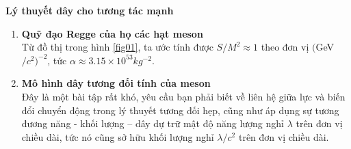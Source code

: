 \textbf{Lý thuyết dây cho tương tác mạnh}

\begin{enumerate}
    \item \textbf{Quỹ đạo Regge của họ các hạt meson}\\
    Từ đồ thị trong hình \ref{fig01}, ta ước tính được $S/M^2 \approx 1$ theo đơn vị $($GeV$/c^2)^{-2}$, tức $\alpha \approx 3.15 \times 10^{53} \si{kg^{-2}}$. 
    
    \item \textbf{Mô hình dây tương đối tính của meson}\\
    Đây là một bài tập rất khó, yêu cầu bạn phải biết về liên hệ giữa lực và biến đổi chuyển động trong lý thuyết tương đối hẹp, cũng như áp dụng sự tương đương năng - khối lượng -- dây dự trữ mật độ năng lượng nghỉ $\lambda$ trên đơn vị chiều dài, tức nó cũng sở hữu khối lượng nghỉ $\lambda/c^2$ trên đơn vị chiều dài.
    

\end{enumerate}

